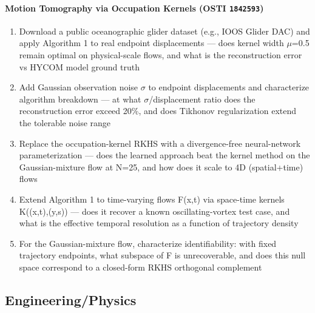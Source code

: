 \paragraph{Motion Tomography via Occupation Kernels \textnormal{\small(OSTI \texttt{1842593})}}
\begin{enumerate}[leftmargin=1.6em,itemsep=0.2em,topsep=0.2em,label=Q\arabic*.]
\item Download a public oceanographic glider dataset (e.g., IOOS Glider DAC) and apply Algorithm 1 to real endpoint displacements --- does kernel width $\mu$=0.5 remain optimal on physical-scale flows, and what is the reconstruction error vs HYCOM model ground truth
\item Add Gaussian observation noise $\sigma$ to endpoint displacements and characterize algorithm breakdown --- at what $\sigma$/displacement ratio does the reconstruction error exceed 20\%, and does Tikhonov regularization extend the tolerable noise range
\item Replace the occupation-kernel RKHS with a divergence-free neural-network parameterization --- does the learned approach beat the kernel method on the Gaussian-mixture flow at N=25, and how does it scale to 4D (spatial+time) flows
\item Extend Algorithm 1 to time-varying flows F(x,t) via space-time kernels K((x,t),(y,s)) --- does it recover a known oscillating-vortex test case, and what is the effective temporal resolution as a function of trajectory density
\item For the Gaussian-mixture flow, characterize identifiability: with fixed trajectory endpoints, what subspace of F is unrecoverable, and does this null space correspond to a closed-form RKHS orthogonal complement
\end{enumerate}
\subsection*{Engineering/Physics}
